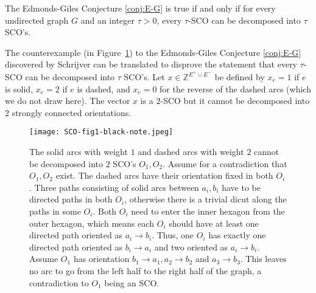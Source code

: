 \documentclass[runningheads]{llncs}
\newcommand{\Z}{\mathbb{Z}}
\begin{document}
\begin{theorem}\label{thm:eq_E-G}
The Edmonds-Giles Conjecture \ref{conj:E-G} is true if and only if for every undirected graph $G$ and an integer $\tau>0$, every $\tau$-SCO can be decomposed into $\tau$ SCO's.
\end{theorem}
The counterexample (in Figure~\ref{fig:strongly_connected_orientation}) to the Edmonds-Giles Conjecture \ref{conj:E-G} discovered by Schrijver  \cite{schrijver1980counterexample} can be translated to disprove the statement that every $\tau$-SCO can be decomposed into $\tau$ SCO's. Let $x\in \Z^{E^+\cup E^-}$ be defined by $x_{e}=1$ if $e$ is solid, $x_e=2$ if $e$ is dashed, and $x_e=0$ for the reverse of the dashed arcs (which we do not draw here). The vector $x$ is a $2$-SCO but it cannot be decomposed into $2$ strongly connected orientations.
\begin{figure}[htbp]
	\centering
	\texttt{[image: SCO-fig1-black-note.jpeg]}
 \caption{The solid arcs with weight $1$ and dashed arcs with weight $2$ cannot be decomposed into $2$ SCO's $O_1,O_2$. Assume for a contradiction that $O_1,O_2$ exist. The dashed arcs have their orientation fixed in both $O_i$. Three paths consisting of solid arcs between $a_i,b_i$ have to be directed paths in both $O_i$, otherwise there is a trivial dicut along the paths in some $O_i$. Both $O_i$ need to enter the inner hexagon from the outer hexagon, which means each $O_i$ should have at least one directed path oriented as $a_i\rightarrow b_i$. Thus, one $O_i$ has exactly one directed path oriented as $b_i\rightarrow a_i$ and two oriented as $a_i\rightarrow b_i$. Assume $O_1$ has orientation $b_1\rightarrow a_1, a_2\rightarrow b_2$ and $a_3\rightarrow b_3$. This leaves no arc to go from the left half to the right half of the graph, a contradiction to $O_1$ being an SCO.}
 \label{fig:strongly_connected_orientation}
\end{figure}
\end{document}
